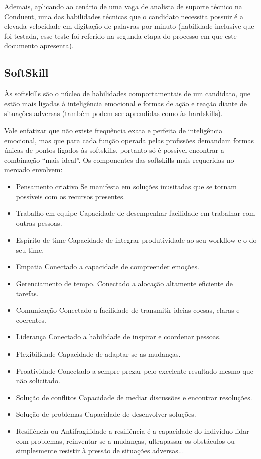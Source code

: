 \documentclass[12pt]{article}
\begin{document}
Ademais, aplicando ao cenário de uma vaga de analista de suporte técnico na Conduent, uma das habilidades técnicas que o candidato necessita possuir é a elevada velocidade em digitação de palavras por minuto (habilidade inclusive que foi testada, esse teste foi referido na segunda etapa do processo em que este documento apresenta).

\subsection{SoftSkill}

Às softskills são o núcleo de habilidades comportamentais de um candidato, que estão mais ligadas à inteligência emocional e formas de ação e reação diante de situações adversas (também podem ser aprendidas como às hardskills).

Vale enfatizar que não existe frequência exata e perfeita de inteligência emocional, mas que para cada função operada pelas profissões demandam formas únicas de pontos ligados às softskills, portanto só é possível encontrar a combinação “mais ideal”. Os componentes das softskills mais requeridas no mercado envolvem:

\begin{itemize}

\item Pensamento criativo
 \subitem Se manifesta em soluções inusitadas que se tornam possíveis com os recursos presentes.
\item Trabalho em equipe
	\subitem Capacidade de desempenhar facilidade em trabalhar com outras pessoas.
\item Espírito de time
	\subitem Capacidade de integrar produtividade ao seu workflow e o do seu time.
\item Empatia
	\subitem Conectado a capacidade de compreender emoções.
\item Gerenciamento de tempo.
	\subitem Conectado a alocação altamente eficiente de tarefas.
\item Comunicação
	\subitem Conectado a facilidade de transmitir ideias coesas, claras e coerentes.
\item Liderança
	\subitem Conectado a habilidade de inspirar e coordenar pessoas.
\item Flexibilidade
	\subitem Capacidade de adaptar-se as mudanças.
\item Proatividade
	\subitem Conectado a sempre prezar pelo excelente resultado mesmo que não solicitado.
\item Solução de conflitos
	\subitem Capacidade de mediar discussões e encontrar resoluções.
\item Solução de problemas
	\subitem Capacidade de desenvolver soluções.
\item Resiliência ou Antifragilidade
	\subitem a resiliência é a capacidade do indivíduo lidar com problemas, reinventar-se a mudanças, ultrapassar os obstáculos ou simplesmente resistir à pressão de situações adversas...

\end{itemize}
\end{document}
